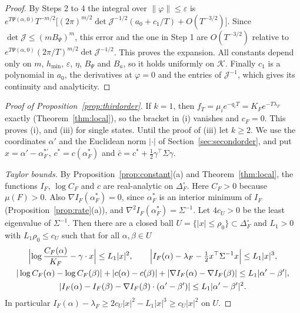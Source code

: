 \begin{proof}
By Steps 2 to 4 the integral over $\lVert\varphi\rVert\le\varepsilon$ is
$e^{T\Psi(\alpha,0)}T^{-m/2}\bigl[(2\pi)^{m/2}\det\mathcal J^{-1/2}(a_0+c_1/T)
+O(T^{-3/2})\bigr]$. Since $\det\mathcal J\le(mB_\Psi)^m$, this error and the
one in Step 1 are $O(T^{-3/2})$ relative to
$e^{T\Psi(\alpha,0)}(2\pi/T)^{m/2}\det\mathcal J^{-1/2}$. This proves the
expansion. All constants depend only on $m$, $h_{\min}$, $\varepsilon$,
$\eta$, $B_\Psi$ and $B_a$, so it holds uniformly on $\mathcal K$. Finally
$c_1$ is a polynomial in $a_0$, the derivatives at $\varphi=0$ and the entries
of $\mathcal J^{-1}$, which gives its continuity and analyticity.
\end{proof}

\begin{proof}[Proof of Proposition~\ref{prop:thirdorder}]
If $k=1$, then $f_T=\mu_ie^{-q_iT}=K_Fe^{-T\lambda_F}$ exactly
(Theorem~\ref{thm:local}), so the bracket in (i) vanishes and $c_F=0$. This
proves (i), and (iii) for single states. Until the proof of (iii) let
$k\ge2$. We use the coordinates $\alpha'$ and the Euclidean norm
$|\cdot|$ of Section~\ref{sec:secondorder}, and put
$x=\alpha'-\alpha^{*\prime}_F$, $c^*=c(\alpha^*_F)$ and
$\bar c=c^*+\frac12\gamma^\top\Sigma\gamma$.

\emph{Taylor bounds.} By Proposition~\ref{prop:constant}(a) and
Theorem~\ref{thm:local}, the functions $I_F$, $\log C_F$ and $c$ are
real-analytic on $\Delta_F^\circ$. Here $C_F>0$ because $\mu(F)>0$. Also
$\nabla I_F(\alpha^*_F)=0$, since $\alpha^*_F$ is an interior minimum of $I_F$
(Proposition~\ref{prop:rate}(a)), and $\nabla^2I_F(\alpha^*_F)=\Sigma^{-1}$.
Let $4c_U>0$ be the least eigenvalue of $\Sigma^{-1}$. Then there are a closed
ball $U=\{|x|\le\rho_0\}\subset\Delta_F^\circ$ and $L_1>0$ with
$L_1\rho_0\le c_U$ such that for all $\alpha,\beta\in U$
\begin{gather*}
\Bigl|\log\frac{C_F(\alpha)}{K_F}-\gamma\cdot x\Bigr|\le L_1|x|^2,\qquad
\Bigl|I_F(\alpha)-\lambda_F-\tfrac12x^\top\Sigma^{-1}x\Bigr|\le L_1|x|^3,\\
|\log C_F(\alpha)-\log C_F(\beta)|+|c(\alpha)-c(\beta)|
+|\nabla I_F(\alpha)-\nabla I_F(\beta)|\le L_1|\alpha'-\beta'|,\\
|I_F(\alpha)-I_F(\beta)-\nabla I_F(\beta)\cdot(\alpha'-\beta')|
\le L_1|\alpha'-\beta'|^2 .
\end{gather*}
In particular $I_F(\alpha)-\lambda_F\ge2c_U|x|^2-L_1|x|^3\ge c_U|x|^2$ on $U$.


\end{proof}
